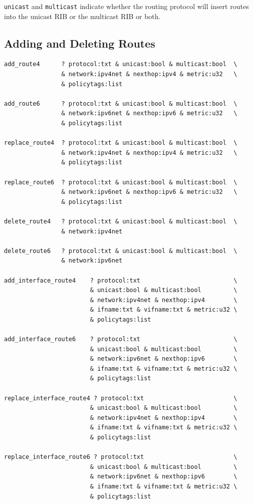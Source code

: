 \documentclass[11pt]{article}
\begin{document}
{\tt unicast} and {\tt multicast} indicate whether the routing
protocol will insert routes into the unicast RIB or the multicast RIB
or both.

\subsection{Adding and Deleting Routes}

\begin{verbatim}
add_route4      ? protocol:txt & unicast:bool & multicast:bool  \
                & network:ipv4net & nexthop:ipv4 & metric:u32   \
                & policytags:list

add_route6      ? protocol:txt & unicast:bool & multicast:bool  \
                & network:ipv6net & nexthop:ipv6 & metric:u32   \
                & policytags:list

replace_route4  ? protocol:txt & unicast:bool & multicast:bool  \
                & network:ipv4net & nexthop:ipv4 & metric:u32   \
                & policytags:list

replace_route6  ? protocol:txt & unicast:bool & multicast:bool  \
                & network:ipv6net & nexthop:ipv6 & metric:u32   \
                & policytags:list

delete_route4   ? protocol:txt & unicast:bool & multicast:bool  \
                & network:ipv4net

delete_route6   ? protocol:txt & unicast:bool & multicast:bool  \
                & network:ipv6net

add_interface_route4    ? protocol:txt                          \
                        & unicast:bool & multicast:bool         \
                        & network:ipv4net & nexthop:ipv4        \
                        & ifname:txt & vifname:txt & metric:u32 \
                        & policytags:list

add_interface_route6    ? protocol:txt                          \
                        & unicast:bool & multicast:bool         \
                        & network:ipv6net & nexthop:ipv6        \
                        & ifname:txt & vifname:txt & metric:u32 \
                        & policytags:list

replace_interface_route4 ? protocol:txt                         \
                        & unicast:bool & multicast:bool         \
                        & network:ipv4net & nexthop:ipv4        \
                        & ifname:txt & vifname:txt & metric:u32 \
                        & policytags:list

replace_interface_route6 ? protocol:txt                         \
                        & unicast:bool & multicast:bool         \
                        & network:ipv6net & nexthop:ipv6        \
                        & ifname:txt & vifname:txt & metric:u32 \
                        & policytags:list
\end{verbatim}
\end{document}
